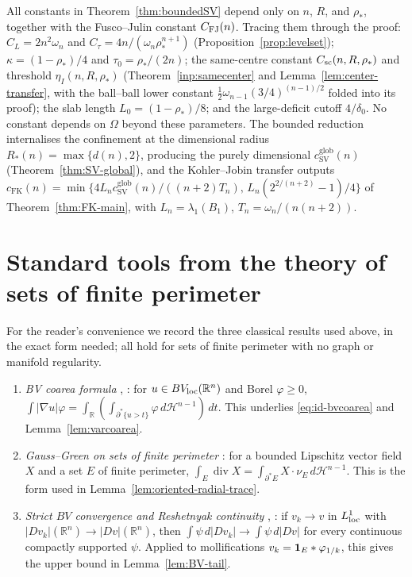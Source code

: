 \documentclass[11pt]{amsart}
\theoremstyle{definition}
\newcommand{\R}{\mathbb R}
\newcommand{\Om}{\Omega}
\newcommand{\rstar}{\rho_*}
\newcommand{\Hn}{\mathcal H^{n-1}}
\begin{document}
\noindent
All constants in Theorem~\ref{thm:boundedSV} depend only on \(n\), \(R\), and
\(\rstar\), together with the Fusco--Julin constant \(C_{\rm FJ}(n)\).
Tracing them through the proof: \(C_L=2n^2\omega_n\) and
\(C_\tau=4n/(\omega_n\rstar^{n+1})\) (Proposition~\ref{prop:levelset});
\(\kappa=(1-\rstar)/4\) and \(\tau_0=\rstar/(2n)\); the same-centre
constant \(C_{\rm sc}(n,R,\rstar)\) and threshold \(\eta_I(n,R,\rstar)\)
(Theorem~\ref{inp:samecenter} and Lemma~\ref{lem:center-transfer}, with the
ball--ball lower constant \(\tfrac12\omega_{n-1}(3/4)^{(n-1)/2}\) folded into its
proof);
the slab length
\(L_0=(1-\rstar)/8\); and the large-deficit cutoff \(4/\delta_0\).  No constant
depends on \(\Om\) beyond these parameters.  The bounded reduction internalises
the confinement at the dimensional radius \(R_*(n)=\max\{d(n),2\}\), producing
the purely dimensional \(c_{\mathrm{SV}}^{\mathrm{glob}}(n)\)
(Theorem~\ref{thm:SV-global}), and the Kohler--Jobin transfer outputs
\(c_{\mathrm{FK}}(n)=\min\{4L_n c_{\mathrm{SV}}^{\mathrm{glob}}(n)/((n+2)T_n),\,
L_n(2^{2/(n+2)}-1)/4\}\) of Theorem~\ref{thm:FK-main}, with
\(L_n=\lambda_1(B_1)\), \(T_n=\omega_n/(n(n+2))\).

\appendix

\section{Standard tools from the theory of sets of finite perimeter}
\label{app:bv}

For the reader's convenience we record the three classical results used above,
in the exact form needed; all hold for sets of finite perimeter with no graph
or manifold regularity.

\begin{enumerate}[leftmargin=2em]
\item \emph{BV coarea formula} \cite[Thm.~13.1]{Maggi2012},
\cite[Thm.~3.40]{AFP2000}: for \(u\in BV_{\rm loc}(\R^n)\) and Borel
\(\varphi\ge0\),
\(\int|\nabla u|\varphi=\int_{\R}(\int_{\partial^*\{u>t\}}\varphi\,d\Hn)\,dt\).
This underlies \eqref{eq:id-bvcoarea} and Lemma~\ref{lem:varcoarea}.
\item \emph{Gauss--Green on sets of finite perimeter}
\cite[Ch.~17]{Maggi2012}: for a bounded Lipschitz vector field \(X\) and a set
\(E\) of finite perimeter,
\(\int_E\operatorname{div}X=\int_{\partial^*E}X\cdot\nu_E\,d\Hn\).  This is the
form used in Lemma~\ref{lem:oriented-radial-trace}.
\item \emph{Strict \(BV\) convergence and Reshetnyak continuity}
\cite[Thm.~2.39]{AFP2000}, \cite[Ch.~20]{Maggi2012}: if
\(v_k\to v\) in \(L^1_{\rm loc}\) with \(|Dv_k|(\R^n)\to|Dv|(\R^n)\), then
\(\int\psi\,d|Dv_k|\to\int\psi\,d|Dv|\) for every continuous compactly
supported \(\psi\).  Applied to mollifications \(v_k={\bf1}_E*\varphi_{1/k}\),
this gives the upper bound in Lemma~\ref{lem:BV-tail}.
\end{enumerate}
\end{document}
